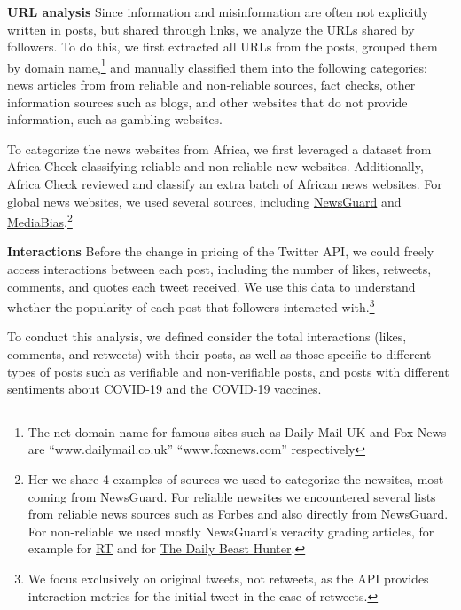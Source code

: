 \textbf{URL analysis} %
Since information and misinformation are often not explicitly written in posts, but shared through links, we analyze the URLs shared by followers. To do this, we first extracted all URLs from the posts, grouped them by domain name,\footnote{The net domain name for famous sites such as Daily Mail UK and Fox News are ``www.dailymail.co.uk'' ``www.foxnews.com'' respectively} and manually classified them into the following categories: news articles from from reliable and non-reliable sources, fact checks,  other information sources such as blogs, and other websites that do not provide information, such as gambling websites.


To categorize the news websites from Africa, we first leveraged a dataset from Africa Check classifying reliable and non-reliable new websites. Additionally, Africa Check reviewed and classify an extra batch of African news websites. For global news websites, we used several sources, including \href{https://www.newsguardtech.com/}{NewsGuard} and \href{https://mediabiasfactcheck.com/pro-science/}{MediaBias}.\footnote{Her we share 4 examples of sources we used to categorize the newsites, most coming from NewsGuard. For reliable newsites we encountered several lists from reliable news sources such as \href{https://www.forbes.com/sites/berlinschoolofcreativeleadership/2017/02/01/10-journalism-brands-where-you-will-find-real-facts-rather-than-alternative-facts/?sh=2ae983c2e9b5}{Forbes} and also directly from \href{https://web.archive.org/web/20230110151501/https://www.newsguardtech.com/special-reports/uk-special-report-the-best-and-worst-of-2022/}{NewsGuard}. For non-reliable we used mostly NewsGuard's veracity grading articles, for example for \href{https://www.newsguardtech.com/press/newsguard-launches-russia-ukraine-disinformation-tracking-center/}{RT} and for \href{https://www.newsbusters.org/blogs/free-speech/catherine-salgado/2022/04/28/whoa-newsguard-finally-downgrades-daily-beast-hunter}{The Daily Beast Hunter}.}

\textbf{Interactions} Before the change in pricing of the Twitter API, we could freely access interactions between each post, including the number of likes, retweets, comments, and quotes each tweet received. We use this data to understand whether the popularity of each post that followers interacted with.\footnote{We focus exclusively on original tweets, not retweets, as the API provides interaction metrics for the initial tweet in the case of retweets.} %

To conduct this analysis, we defined consider the total interactions (likes, comments, and retweets) with their posts, as well as those specific to different types of posts such as verifiable and non-verifiable posts, and posts with different sentiments about COVID-19 and the COVID-19 vaccines.
